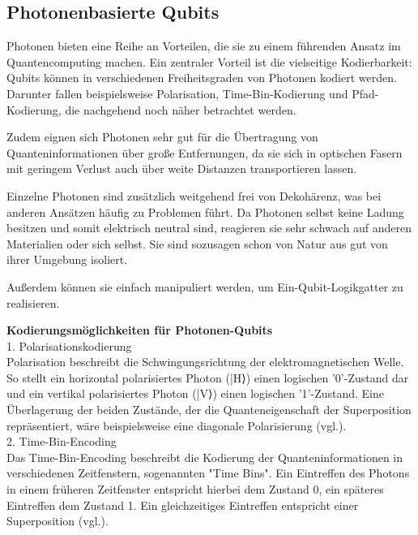 \subsection{Photonenbasierte Qubits}
\label{subsec: Photonenbasierte Qubits}
Photonen bieten eine Reihe an Vorteilen, die sie zu einem führenden Ansatz im Quantencomputing machen. Ein zentraler Vorteil ist die vielseitige Kodierbarkeit: Qubits können in verschiedenen Freiheitsgraden von Photonen kodiert werden. Darunter fallen beispielsweise Polarisation, Time-Bin-Kodierung und Pfad-Kodierung, die nachgehend noch näher betrachtet werden. 


Zudem eignen sich Photonen sehr gut für die Übertragung von Quanteninformationen über große Entfernungen, da sie sich in optischen Fasern mit geringem Verlust auch über weite Distanzen transportieren lassen. 


Einzelne Photonen sind zusätzlich weitgehend frei von Dekohärenz, was bei anderen Ansätzen häufig zu Problemen führt. Da Photonen selbst keine Ladung besitzen und somit elektrisch neutral sind, reagieren sie sehr schwach auf anderen Materialien oder sich selbst. Sie sind sozusagen schon von Natur aus gut von ihrer Umgebung isoliert. 


Außerdem können sie einfach manipuliert werden, um Ein-Qubit-Logikgatter zu realisieren. 

\textbf{Kodierungsmöglichkeiten für Photonen-Qubits}\\

1. Polarisationskodierung\\
Polarisation beschreibt die Schwingungsrichtung der elektromagnetischen Welle.  So stellt ein horizontal polarisiertes Photon (|H⟩) einen logischen '0'-Zustand dar und ein vertikal polarisiertes Photon (|V⟩) einen logischen '1'-Zustand. Eine Überlagerung der beiden Zustände, der die Quanteneigenschaft der Superposition repräsentiert, wäre beispielsweise eine diagonale Polarisierung (vgl.\cite{obrien_optical_2007}).\\

2. Time-Bin-Encoding \\
Das Time-Bin-Encoding beschreibt die Kodierung der Quanteninformationen in verschiedenen Zeitfenstern, sogenannten "Time Bins". 
Ein Eintreffen des Photons in einem früheren Zeitfenster entspricht hierbei dem Zustand 0, ein späteres Eintreffen dem Zustand 1. Ein gleichzeitiges Eintreffen entspricht einer Superposition (vgl.\cite{obrien_optical_2007}). \\ 

